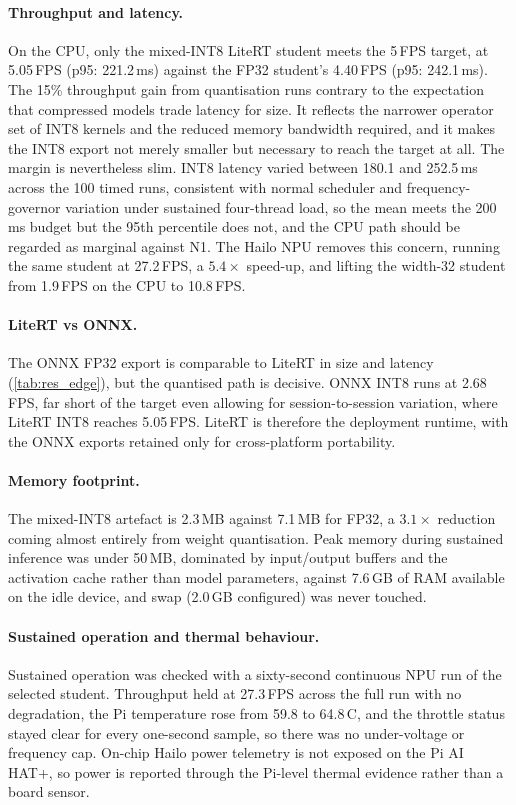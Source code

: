 \paragraph{Throughput and latency.}
On the CPU, only the mixed-INT8 LiteRT student meets the 5\,FPS target, at 5.05\,FPS (p95: 221.2\,ms) against the FP32 student's 4.40\,FPS (p95: 242.1\,ms). The 15\% throughput gain from quantisation runs contrary to the expectation that compressed models trade latency for size. It reflects the narrower operator set of INT8 kernels and the reduced memory bandwidth required, and it makes the INT8 export not merely smaller but necessary to reach the target at all. The margin is nevertheless slim. INT8 latency varied between 180.1 and 252.5\,ms across the 100 timed runs, consistent with normal scheduler and frequency-governor variation under sustained four-thread load, so the mean meets the 200\,ms budget but the 95th percentile does not, and the CPU path should be regarded as marginal against N1. The Hailo NPU removes this concern, running the same student at 27.2\,FPS, a $5.4\times$ speed-up, and lifting the width-32 student from 1.9\,FPS on the CPU to 10.8\,FPS.

\paragraph{LiteRT vs ONNX.}
The ONNX FP32 export is comparable to LiteRT in size and latency (\autoref{tab:res_edge}), but the quantised path is decisive. ONNX INT8 runs at 2.68\,FPS, far short of the target even allowing for session-to-session variation, where LiteRT INT8 reaches 5.05\,FPS. LiteRT is therefore the deployment runtime, with the ONNX exports retained only for cross-platform portability.

\paragraph{Memory footprint.}
The mixed-INT8 artefact is 2.3\,MB against 7.1\,MB for FP32, a $3.1\times$ reduction coming almost entirely from weight quantisation. Peak memory during sustained inference was under 50\,MB, dominated by input/output buffers and the activation cache rather than model parameters, against 7.6\,GB of RAM available on the idle device, and swap (2.0\,GB configured) was never touched.

\paragraph{Sustained operation and thermal behaviour.}
Sustained operation was checked with a sixty-second continuous NPU run of the selected student. Throughput held at 27.3\,FPS across the full run with no degradation, the Pi temperature rose from 59.8 to 64.8\,\textdegree C, and the throttle status stayed clear for every one-second sample, so there was no under-voltage or frequency cap. On-chip Hailo power telemetry is not exposed on the Pi AI HAT+, so power is reported through the Pi-level thermal evidence rather than a board sensor.

